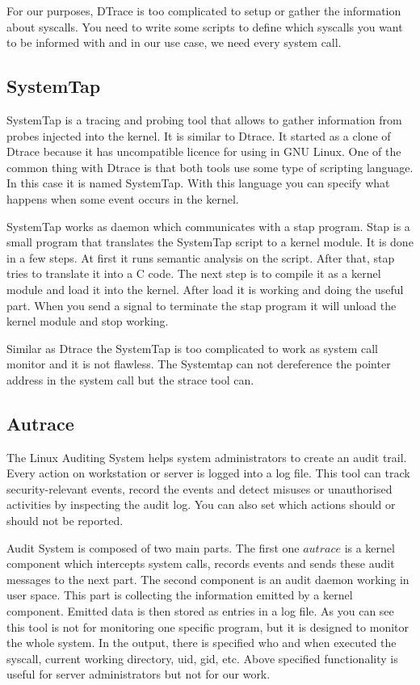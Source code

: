 For our purposes, DTrace is too complicated to setup or gather the information about syscalls.
You need to write some scripts to define which syscalls you want to be informed with and in our use case, we need every system call.

\subsection{SystemTap}
SystemTap \cite{systemtap} is a tracing and probing tool that allows to gather information from probes injected into the kernel.
It is similar to Dtrace.
It started as a clone of Dtrace because it has uncompatible licence for using in GNU Linux.
One of the common thing with Dtrace is that both tools use some type of scripting language.
In this case it is named SystemTap.
With this language you can specify what happens when some event occurs in the kernel.

SystemTap works as daemon which communicates with a stap program.
Stap is a small program that translates the SystemTap script to a kernel module.
It is done in a few steps.
At first it runs semantic analysis on the script.
After that, stap tries to translate it into a C code.
The next step is to compile it as a kernel module and load it into the kernel.
After load it is working and doing the useful part.
When you send a signal to terminate the stap program it will unload the kernel module and stop working.

Similar as Dtrace the SystemTap is too complicated to work as system call monitor and it is not flawless.
The Systemtap can not dereference the pointer address in the system call but the strace tool can.


\subsection{Autrace}
The Linux Auditing System helps system administrators to create an audit trail.
Every action on workstation or server is logged into a log file.
This tool can track security-relevant events, record the events and detect misuses or unauthorised activities by inspecting the audit log.
You can also set which actions should or should not be reported.

Audit System is composed of two main parts.
The first one \(autrace\) is a kernel component which intercepts system calls, records events and sends these audit messages to the next part.
The second component is an audit daemon working in user space.
This part is collecting the information emitted by a kernel component.
Emitted data is then stored as entries in a log file.
As you can see this tool is not for monitoring one specific program, but it is designed to monitor the whole system.
In the output, there is specified who and when executed the syscall, current working directory, uid, gid, etc.
Above specified functionality is useful for server administrators but not for our work.

